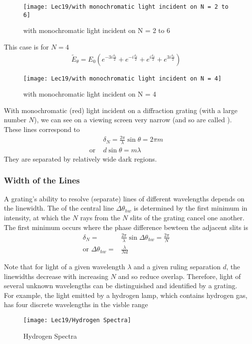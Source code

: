\begin{figure}[H]
    \centering
    \texttt{[image: Lec19/with monochromatic light incident on N = 2 to 6]}
    \caption{with monochromatic light incident on N = 2 to 6}
\end{figure}


This case is for $N=4$
\begin{align*}
    \tilde{E}_{\theta}=E_0\left( e^{-3i\frac{\delta_4}{2}} + e^{-i\frac{\delta_4}{2}} + e^{i\frac{\delta_4}{2}} + e^{3i\frac{\delta_4}{2}}\right)
\end{align*}

\begin{figure}[H]
    \centering
    \texttt{[image: Lec19/with monochromatic light incident on N = 4]}
    \caption{with monochromatic light incident on N = 4}
\end{figure}

With monochromatic (red) light incident on a diffraction grating (with a large number $N$), we can see on a viewing screen very narrow (and so are called ). These lines correspond to 
\begin{align*}
    &\delta_N=\frac{2\pi}{\lambda}\sin\theta=2\pi m\\
    \text{or } &d\sin\theta = m \lambda 
\end{align*}
They are separated by relatively wide dark regions. 

\subsubsection{Width of the Lines}
A grating's ability to resolve (separate) lines of different wavelengths depends on the linewidth. The  of the central line $\Delta \theta_{hw}$ is determined by the first minimum in intensity, at which the $N$ rays from the $N$ slits of the grating cancel one another. The first minimum occurs where the phase difference bewteen the adjacent slits is 
\begin{align*}
    \delta_N=&\frac{2\pi}{\lambda}\sin\Delta\theta_{hw}=\frac{2\pi}{N}\\
    \text{or } \Delta\theta_{hw}=&\frac{\lambda}{Nd}
\end{align*}

Note that for light of a given wavelength $\lambda$ and a given ruling separation $d$, the linewidths decrease with increasing $N$ and so reduce overlap. Therefore, light of several unknown wavelengths can be distinguished and identified by a grating. For example, the light emitted by a hydrogen lamp, which contains hydrogen gas, has four discrete wavelengths in the visble range
\begin{figure}[H]
    \centering
    \texttt{[image: Lec19/Hydrogen Spectra]}
    \caption{Hydrogen Spectra}
\end{figure}

